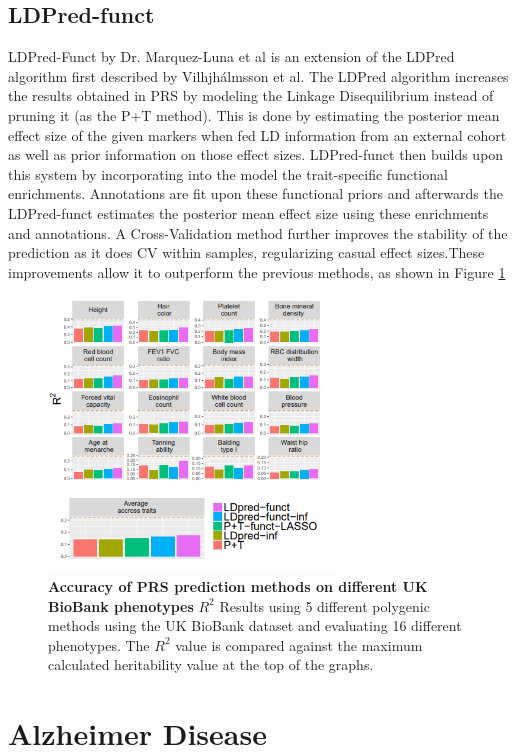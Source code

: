 \subsection{LDPred-funct}
LDPred-Funct by Dr. Marquez-Luna et al\cite{Marquez-Luna375337} is an extension of the LDPred algorithm first described by Vilhjhálmsson et al\cite{ldpreeed}. The LDPred algorithm increases the results obtained in PRS by modeling the Linkage Disequilibrium instead of pruning it (as the P+T method). This is done by estimating the posterior mean effect size of the given markers when fed LD information from an external cohort as well as prior information on those effect sizes. LDPred-funct then builds upon this system by incorporating into the model the trait-specific functional enrichments. Annotations are fit upon these functional priors and afterwards the LDPred-funct estimates the posterior mean effect size using these enrichments and annotations. A Cross-Validation method further improves the stability of the prediction as it does CV within samples, regularizing casual effect sizes.These improvements allow it to outperform the previous methods, as shown in Figure \ref{ldpred1} 

\begin{figure}[!ht]
\centerline{\includegraphics[width=3in,]{images/background/ldpred.png}}
\caption{{\bf Accuracy of PRS prediction methods on different UK BioBank phenotypes\cite{Marquez-Luna375337}} $R^2$ Results using 5 different polygenic methods using the UK BioBank dataset and evaluating 16 different phenotypes. The $R^2$ value is compared against the maximum calculated heritability value at the top of the graphs.}
\label{ldpred1}
\end{figure}
\clearpage
\section{Alzheimer Disease}

